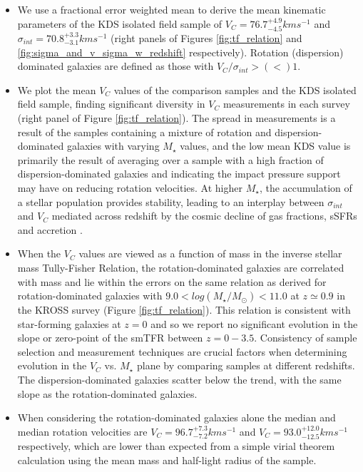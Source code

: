 \documentclass[fleqn,usenatbib]{mn2e}
\begin{document}
\begin{itemize}
    \item We use a fractional error weighted mean to derive the mean kinematic parameters of the KDS isolated field sample of $V_{C} = 76.7^{+4.9}_{-4.5}kms^{-1}$ and $\sigma_{int} = 70.8^{+3.3}_{-3.1} kms^{-1}$ (right panels of Figures \ref{fig:tf_relation} and \ref{fig:sigma_and_v_sigma_w_redshift} respectively).
    Rotation (dispersion) dominated galaxies are defined as those with $V_{C}/\sigma_{int} > (<) 1$.  
    \item We plot the mean $V_{C}$ values of the comparison samples and the KDS isolated field sample, finding significant diversity in $V_{C}$ measurements in each survey (right panel of Figure \ref{fig:tf_relation}).
    The spread in measurements is a result of the samples containing a mixture of rotation and dispersion-dominated galaxies with varying $M_{\star}$ values, and the low mean KDS value is primarily the result of averaging over a sample with a high fraction of dispersion-dominated galaxies and indicating the impact pressure support may have on reducing rotation velocities.
    At higher $M_{\star}$, the accumulation of a stellar population provides stability, leading to an interplay between $\sigma_{int}$ and $V_{C}$ mediated across redshift by the cosmic decline of gas fractions, sSFRs and accretion \citep[e.g.][]{Law2012b,Wisnioski2015}.
    \item When the $V_{C}$ values are viewed as a function of mass in the inverse stellar mass Tully-Fisher Relation, the rotation-dominated galaxies are correlated with mass and lie within the errors on the same relation as derived for rotation-dominated galaxies with $9.0 < log(M_{\star}/M_{\odot}) < 11.0$ at $z\simeq0.9$ in the KROSS survey (Figure \ref{fig:tf_relation}). %
    This relation is consistent with star-forming galaxies at $z=0$ and so we report no significant evolution in the slope or zero-point of the smTFR between $z=0-3.5$.
    Consistency of sample selection and measurement techniques are crucial factors when determining evolution in the $V_{C}$ vs. $M_{\star}$ plane by comparing samples at different redshifts.
    The dispersion-dominated galaxies scatter below the trend, with the same slope as the rotation-dominated galaxies.
    \item When considering the rotation-dominated galaxies alone the median and median rotation velocities are $V_{C} = 96.7^{+7.3}_{-7.2}kms^{-1}$ and $V_{C} = 93.0^{+12.0}_{-12.5}kms^{-1}$ respectively, which are lower than expected from a simple virial theorem calculation using the mean mass and half-light radius of the sample.

\end{itemize}
\end{document}
